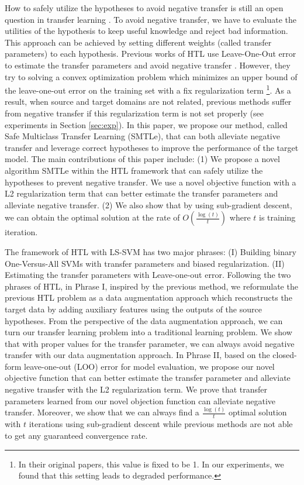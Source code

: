 How to safely utilize the hypotheses to avoid negative transfer is still an open question in transfer learning \cite{Lu201514}. To avoid negative transfer, we have to evaluate the utilities of the hypothesis to keep useful knowledge and reject bad information. This approach can be achieved by setting different weights (called transfer parameters) to each hypothesis.
Previous works of HTL use Leave-One-Out error to estimate the transfer parameters and avoid negative transfer \cite{tommasi2014learning} \cite{kuzborskij2013n}. However, they try to solving a convex
optimization problem which minimizes an upper bound of
the leave-one-out error on the training set with a fix regularization term \footnote{In their original papers, this value is fixed to be 1. In our experiments, we found that this setting leads to degraded performance.}. As a result, when source and target domains are not related, previous methods suffer from negative transfer if this regularization term is not set properly (see experiments in Section \ref{sec:exp}).
In this paper, we propose our method, {called Safe Multiclass Transfer Learning (SMTLe)}, that can both alleviate negative transfer and leverage correct hypotheses to improve the performance of the target model. 
The main contributions of this paper include: (1) We propose a novel algorithm SMTLe within the HTL framework that can safely utilize the hypotheses to prevent negative transfer. We use a novel objective function with a L2 regularization term that can better estimate the transfer parameters and alleviate negative transfer. (2) We also show that by using sub-gradient descent, we can obtain the optimal solution at the rate of $O(\frac{\log(t)}{t})$ where $t$ is training iteration.
 
The framework of HTL with LS-SVM has two major phrases: (I) Building binary One-Versus-All SVMs with transfer parameters and biased regularization. (II) Estimating the transfer parameters with Leave-one-out error.
Following the two phrases of HTL, in Phrase I, inspired by the previous method, we reformulate the previous HTL problem as a data augmentation approach which reconstructs the target data by adding auxiliary features using the outputs of the source hypotheses. From the perspective of the data augmentation approach, we can turn our transfer learning problem into a traditional learning problem. We show that with proper values for the transfer parameter, we can always avoid negative transfer with our data augmentation approach. 
In Phrase II, 
based on the closed-form leave-one-out (LOO) error for model evaluation, we propose our novel objective function that can better estimate the transfer parameter and alleviate negative transfer with the L2 regularization term. We prove that transfer parameters learned from our novel objection function can alleviate negative transfer. Moreover, we show that we can always find a $\frac{\log(t)}{t}$ optimal solution with $t$ iterations using sub-gradient descent while previous methods are not able to get any guaranteed convergence rate.

